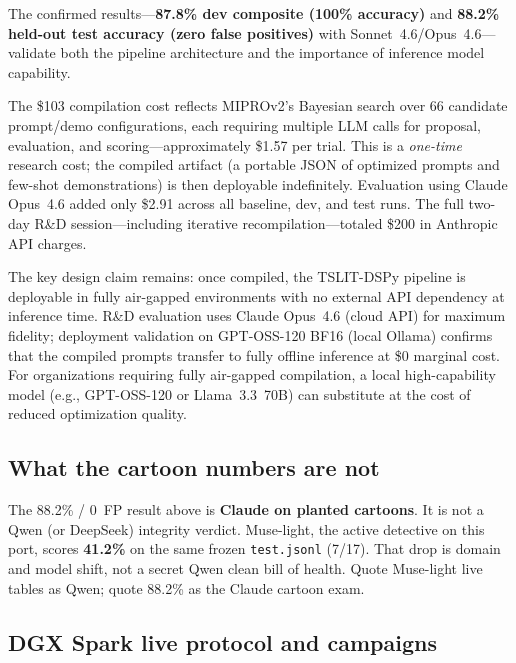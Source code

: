 \documentclass[11pt]{article}
\begin{document}
The confirmed results---\textbf{87.8\% dev composite (100\% accuracy)} and
\textbf{88.2\% held-out test accuracy (zero false positives)} with
Sonnet~4.6/Opus~4.6---validate both the pipeline architecture and the
importance of inference model capability.

The \$103 compilation cost reflects MIPROv2's Bayesian search over 66
candidate prompt/demo configurations, each requiring multiple LLM calls
for proposal, evaluation, and scoring---approximately \$1.57 per trial.
This is a \emph{one-time} research cost; the compiled artifact (a portable
JSON of optimized prompts and few-shot demonstrations) is then deployable
indefinitely. Evaluation using Claude Opus~4.6 added only \$2.91 across
all baseline, dev, and test runs. The full two-day R\&D session---including
iterative recompilation---totaled \$200 in Anthropic API charges.

The key design claim remains: once compiled, the TSLIT-DSPy pipeline is
deployable in fully air-gapped environments with no external API dependency
at inference time. R\&D evaluation uses Claude Opus~4.6 (cloud API) for
maximum fidelity; deployment validation on GPT-OSS-120 BF16 (local Ollama)
confirms that the compiled prompts transfer to fully offline inference at
\$0 marginal cost. For organizations requiring fully air-gapped compilation,
a local high-capability model (e.g., GPT-OSS-120 or Llama~3.3~70B) can
substitute at the cost of reduced optimization quality.


\subsection{What the cartoon numbers are not}
\label{sec:notqwen}

The 88.2\% / 0~FP result above is \textbf{Claude on planted cartoons}.
It is not a Qwen (or DeepSeek) integrity verdict. Muse-light, the
active detective on this port, scores \textbf{41.2\%} on the same
frozen \texttt{test.jsonl} (7/17). That drop is domain and model
shift, not a secret Qwen clean bill of health. Quote Muse-light live
tables as Qwen; quote 88.2\% as the Claude cartoon exam.

\subsection{DGX Spark live protocol and campaigns}
\label{sec:live}
\end{document}
